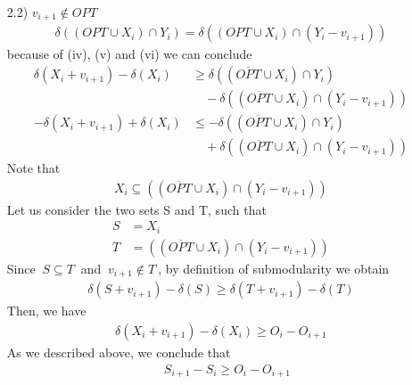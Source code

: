 \documentclass[a4paper,11pt]{article}
\begin{document}
\begin{itemize}
	\item[2.2)] $ v_{i+1} \not  \in OPT$
	\begin{align*}
	\delta((OPT \cup X_i) \cap Y_i) = \delta((OPT \cup X_{i}) \cap (Y_{i} - v_{i+1})) 
	\end{align*}
	because of (iv), (v) and (vi) we can conclude
	\begin{align*}
	\delta(X_{i} + v_{i+1})  - \delta(X_{i}) &\geq  \delta((\overline{OPT} \cup X_i) \cap Y_i)\\ &\quad - \delta((\overline{OPT} \cup X_{i}) \cap (Y_{i} - v_{i+1}))\\
	-\delta(X_{i} + v_{i+1})  + \delta(X_{i}) &\leq  - \delta((\overline{OPT} \cup X_i) \cap Y_i)\\ &\quad + \delta((\overline{OPT} \cup X_{i}) \cap (Y_{i} - v_{i+1}))
	\end{align*}
	Note that 
	\begin{align*}
	X_i \subseteq ((\overline{OPT} \cup X_{i}) \cap (Y_{i} - v_{i+1}))
	\end{align*}
	Let us consider the two sets S and T, such that
	\begin{align*}
	S &= X_i\\
	T &=((\overline{OPT} \cup X_{i}) \cap (Y_{i} - v_{i+1}))
	\end{align*} 
	Since $\ S \subseteq T \ $ and $\ v_{i+1} \not \in T \ $, by definition of submodularity we obtain
	\begin{align*}
	\delta(S + v_{i+1}) - \delta(S)  \geq  \delta(T + v_{i+1}) - \delta(T)
	\end{align*}
	Then, we have
	\begin{align*}
	\delta(X_{i} + v_{i+1})  - \delta(X_{i})   \geq  O_i - O_{i+1} 
	\end{align*}
	As we described above, we conclude that
	\begin{align*}
	\quad S_{i+1} - S_i  \geq O_i - O_{i+1}
	\end{align*}
	
	
\end{itemize}
\end{document}
